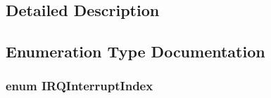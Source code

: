 \subsection{Detailed Description}


\subsection{Enumeration Type Documentation}
\subsubsection[{\texorpdfstring{I\+R\+Q\+Interrupt\+Index}{IRQInterruptIndex}}]{\setlength{\rightskip}{0pt plus 5cm}enum {\bf I\+R\+Q\+Interrupt\+Index}}\hypertarget{group___interrupt__vector__numbers_ga5f3656e2a154b64aa378a2f3856c3a8d}{}\label{group___interrupt__vector__numbers_ga5f3656e2a154b64aa378a2f3856c3a8d}
